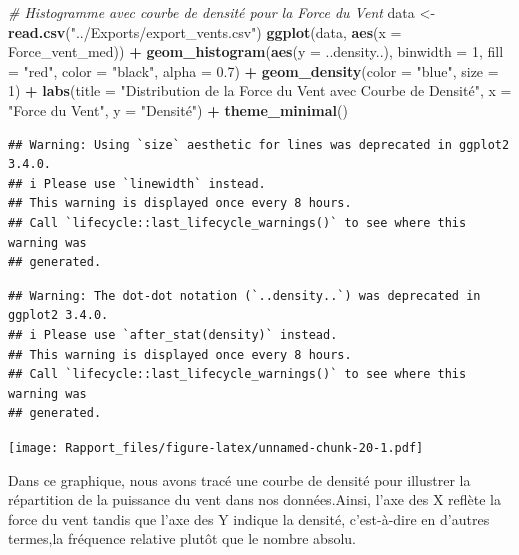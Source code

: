\documentclass[
]{article}
\newenvironment{Shaded}{\begin{snugshade}}{\end{snugshade}}
\newcommand{\AttributeTok}[1]{\textcolor[rgb]{0.13,0.29,0.53}{#1}}
\newcommand{\CommentTok}[1]{\textcolor[rgb]{0.56,0.35,0.01}{\textit{#1}}}
\newcommand{\DecValTok}[1]{\textcolor[rgb]{0.00,0.00,0.81}{#1}}
\newcommand{\FloatTok}[1]{\textcolor[rgb]{0.00,0.00,0.81}{#1}}
\newcommand{\FunctionTok}[1]{\textcolor[rgb]{0.13,0.29,0.53}{\textbf{#1}}}
\newcommand{\NormalTok}[1]{#1}
\newcommand{\OtherTok}[1]{\textcolor[rgb]{0.56,0.35,0.01}{#1}}
\newcommand{\SpecialCharTok}[1]{\textcolor[rgb]{0.81,0.36,0.00}{\textbf{#1}}}
\newcommand{\StringTok}[1]{\textcolor[rgb]{0.31,0.60,0.02}{#1}}
\begin{document}
\begin{Shaded}
\begin{Highlighting}[]
\CommentTok{\# Histogramme avec courbe de densité pour la Force du Vent}
\NormalTok{data }\OtherTok{\textless{}{-}} \FunctionTok{read.csv}\NormalTok{(}\StringTok{"../Exports/export\_vents.csv"}\NormalTok{)}
\FunctionTok{ggplot}\NormalTok{(data, }\FunctionTok{aes}\NormalTok{(}\AttributeTok{x =}\NormalTok{ Force\_vent\_med)) }\SpecialCharTok{+}
  \FunctionTok{geom\_histogram}\NormalTok{(}\FunctionTok{aes}\NormalTok{(}\AttributeTok{y =}\NormalTok{ ..density..), }\AttributeTok{binwidth =} \DecValTok{1}\NormalTok{, }\AttributeTok{fill =} \StringTok{"red"}\NormalTok{, }\AttributeTok{color =} \StringTok{"black"}\NormalTok{, }\AttributeTok{alpha =} \FloatTok{0.7}\NormalTok{) }\SpecialCharTok{+}
  \FunctionTok{geom\_density}\NormalTok{(}\AttributeTok{color =} \StringTok{"blue"}\NormalTok{, }\AttributeTok{size =} \DecValTok{1}\NormalTok{) }\SpecialCharTok{+} 
  \FunctionTok{labs}\NormalTok{(}\AttributeTok{title =} \StringTok{"Distribution de la Force du Vent avec Courbe de Densité"}\NormalTok{, }\AttributeTok{x =} \StringTok{"Force du Vent"}\NormalTok{, }\AttributeTok{y =} \StringTok{"Densité"}\NormalTok{) }\SpecialCharTok{+}
  \FunctionTok{theme\_minimal}\NormalTok{()}
\end{Highlighting}
\end{Shaded}

\begin{verbatim}
## Warning: Using `size` aesthetic for lines was deprecated in ggplot2 3.4.0.
## i Please use `linewidth` instead.
## This warning is displayed once every 8 hours.
## Call `lifecycle::last_lifecycle_warnings()` to see where this warning was
## generated.
\end{verbatim}

\begin{verbatim}
## Warning: The dot-dot notation (`..density..`) was deprecated in ggplot2 3.4.0.
## i Please use `after_stat(density)` instead.
## This warning is displayed once every 8 hours.
## Call `lifecycle::last_lifecycle_warnings()` to see where this warning was
## generated.
\end{verbatim}

\texttt{[image: Rapport\_files/figure-latex/unnamed-chunk-20-1.pdf]}

Dans ce graphique, nous avons tracé une courbe de densité pour illustrer
la répartition de la puissance du vent dans nos données.Ainsi, l'axe des
X reflète la force du vent tandis que l'axe des Y indique la densité,
c'est-à-dire en d'autres termes,la fréquence relative plutôt que le
nombre absolu.
\end{document}

